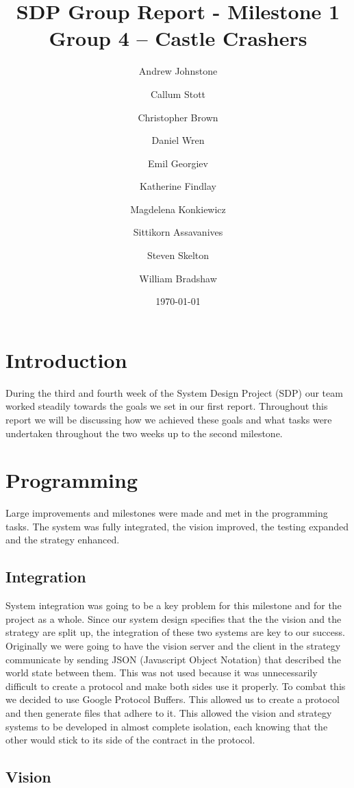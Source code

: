 \documentclass[12pt, a4paper, titlepage]{article}
\title{\small{SDP Group Report - Milestone 1} \\ \huge Group 4 -- Castle Crashers}
\author{Andrew Johnstone \and Callum Stott \and Christopher Brown \and Daniel Wren \and Emil Georgiev \and Katherine Findlay \and Magdelena Konkiewicz \and Sittikorn Assavanives \and Steven Skelton \and William Bradshaw}
\date{\today}
\begin{document}
\maketitle

\section{Introduction}

During the third and fourth week of the System Design Project (SDP) our team
worked steadily towards the goals we set in our first report. Throughout this
report we will be discussing how we achieved these goals and what tasks were
undertaken throughout the two weeks up to the second milestone.

\section{Programming}

Large improvements and milestones were made and met in the programming tasks.
The system was fully integrated, the vision improved, the testing expanded and
the strategy enhanced.

\subsection{Integration}

System integration was going to be a key problem for this milestone and
for the project as a whole. Since our system design specifies that the the
vision and the strategy are split up, the integration of these two systems
are key to our success. Originally we were going to have the vision server
and the client in the strategy communicate by sending JSON (Javascript Object
Notation) that described the world state between them. This was not used
because it was unnecessarily difficult to create a protocol and make both
sides use it properly. To combat this we decided to use Google Protocol
Buffers\cite{protobuf}. This allowed us to create a protocol and then generate
files that adhere to it. This allowed the vision and strategy systems to be
developed in almost complete isolation, each knowing that the other would stick
to its side of the contract in the protocol.

\subsection{Vision}
\end{document}
